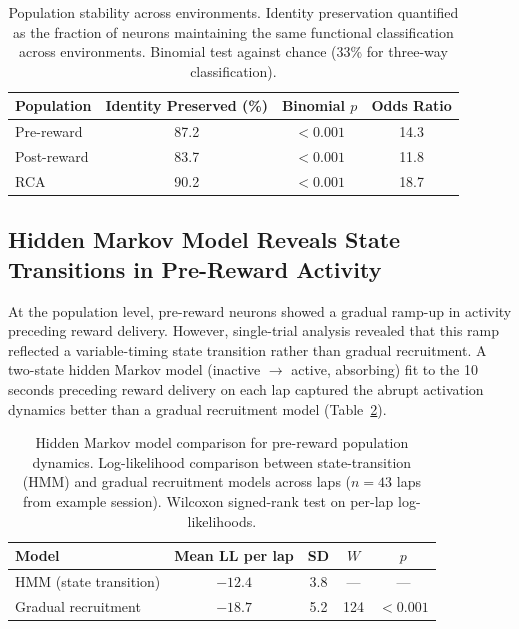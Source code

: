 \documentclass[11pt]{article}
\begin{document}
\begin{table}[H]
\centering
\caption{Population stability across environments. Identity preservation quantified as the fraction of neurons maintaining the same functional classification across environments. Binomial test against chance (33\% for three-way classification).}
\label{tab:env_switch}
\begin{tabular}{lccc}
\toprule
\textbf{Population} & \textbf{Identity Preserved (\%)} & \textbf{Binomial $p$} & \textbf{Odds Ratio} \\
\midrule
Pre-reward & 87.2 & $< 0.001$ & 14.3 \\
Post-reward & 83.7 & $< 0.001$ & 11.8 \\
RCA & 90.2 & $< 0.001$ & 18.7 \\
\bottomrule
\end{tabular}
\end{table}

\subsection{Hidden Markov Model Reveals State Transitions in Pre-Reward Activity}

At the population level, pre-reward neurons showed a gradual ramp-up in activity preceding reward delivery. However, single-trial analysis revealed that this ramp reflected a variable-timing state transition rather than gradual recruitment. A two-state hidden Markov model (inactive $\rightarrow$ active, absorbing) fit to the 10 seconds preceding reward delivery on each lap captured the abrupt activation dynamics better than a gradual recruitment model (Table~\ref{tab:hmm}).

\begin{table}[H]
\centering
\caption{Hidden Markov model comparison for pre-reward population dynamics. Log-likelihood comparison between state-transition (HMM) and gradual recruitment models across laps ($n = 43$ laps from example session). Wilcoxon signed-rank test on per-lap log-likelihoods.}
\label{tab:hmm}
\begin{tabular}{lcccc}
\toprule
\textbf{Model} & \textbf{Mean LL per lap} & \textbf{SD} & \textbf{$W$} & \textbf{$p$} \\
\midrule
HMM (state transition) & $-12.4$ & 3.8 & --- & --- \\
Gradual recruitment & $-18.7$ & 5.2 & 124 & $< 0.001$ \\
\bottomrule
\end{tabular}
\end{table}
\end{document}
